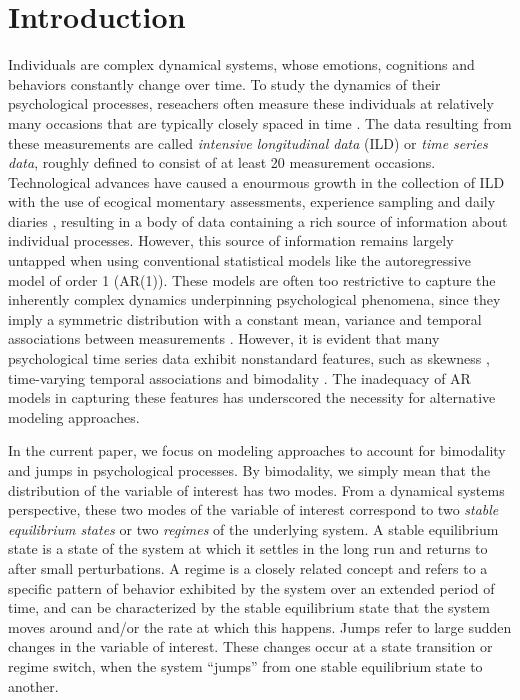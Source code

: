 \documentclass{article}
\begin{document}
\section{Introduction}
Individuals are complex dynamical systems, whose emotions, cognitions and behaviors constantly change over time.
To study the dynamics of their psychological processes, reseachers often measure these individuals at relatively many occasions that are typically closely spaced in time \citep{bolger2013intensive, walls2006models}.
The data resulting from these measurements are called \textit{intensive longitudinal data} (ILD) or \textit{time series data}, roughly defined to consist of at least 20 measurement occasions.
Technological advances have caused a enourmous growth in the collection of ILD with the use of ecogical momentary assessments, experience sampling and daily diaries \citep{notimelikethepresent}, resulting in a body of data containing a rich source of information about individual processes.
However, this source of information remains largely untapped when using conventional statistical models like the autoregressive model of order 1 (AR(1)). These models are often too restrictive to capture the inherently complex dynamics underpinning psychological phenomena, since they imply a symmetric distribution with a constant mean, variance and temporal associations between measurements \citep{box_jenkins, chatfield}.
However, it is evident that many psychological time series data exhibit nonstandard features, such as skewness \citep{skewness_oisin, skewness_2, skewness_3}, time-varying temporal associations \citep{changing_inertia_1, changing_inertia_2} and bimodality \citep{skewness_oisin, bimodality_han}.
The inadequacy of AR models in capturing these features has underscored the necessity for alternative modeling approaches.

In the current paper, we focus on modeling approaches to account for bimodality and jumps in psychological processes.
By bimodality, we simply mean that the distribution of the variable of interest has two modes.
From a dynamical systems perspective, these two modes of the variable of interest correspond to two \textit{stable equilibrium states} or two \textit{regimes} of the underlying system.
A stable equilibrium state is a state of the system at which it settles in the long run and returns to after small perturbations.
A regime is a closely related concept and refers to a specific pattern of behavior exhibited by the system over an extended period of time, and can be characterized by the stable equilibrium state that the system moves around and/or the rate at which this happens.
Jumps refer to large sudden changes in the variable of interest.
These changes occur at a state transition or regime switch, when the system ``jumps'' from one stable equilibrium state to another.
\end{document}

